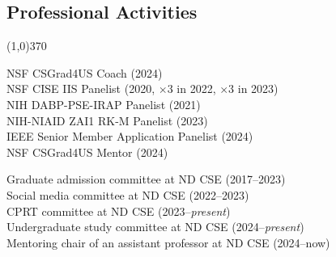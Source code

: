 \documentclass[10pt]{article}
\newenvironment{myindentpar}[1]%
{\begin{list}{}%
         {\setlength{\leftmargin}{#1}}%
         \item[]%
}
{\end{list}}
\newcounter{list}
\begin{document}
\subsection{\sc Professional Activities}
\vspace{-0.4cm} \line(1,0){370} \vspace{-0.1cm}

\begin{myindentpar}{0.75cm}

\hspace{-0.75cm}{\bf Professional Service}

{\small
\textcolor{white}{} NSF CSGrad4US Coach (2024) \\
\textcolor{white}{} NSF CISE IIS Panelist (2020, $\times 3$ in 2022, $\times 3$ in 2023) \\
\textcolor{white}{} NIH DABP-PSE-IRAP Panelist (2021) \\
\textcolor{white}{} NIH-NIAID ZAI1 RK-M Panelist (2023) \\
\textcolor{white}{} IEEE Senior Member Application Panelist (2024) \\
\textcolor{white}{} NSF CSGrad4US Mentor (2024)
}

\hspace{-0.75cm}{\bf Departmental Service}

{\small

\textcolor{white}{} Graduate admission committee at ND CSE (2017--2023) \\
\textcolor{white}{} Social media committee at ND CSE (2022--2023) \\
\textcolor{white}{} CPRT committee at ND CSE (2023--\textit{present}) \\
\textcolor{white}{} Undergraduate study committee at ND CSE (2024--\textit{present}) \\
\textcolor{white}{} Mentoring chair of an assistant professor at ND CSE (2024--now)

}

\hspace{-0.75cm}{\bf Ph.D. Dissertation Committee}

{\small

}
\end{myindentpar}
\end{document}
